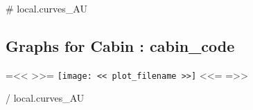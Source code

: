 
{{# local.curves_AU}}

\subsection{Graphs for Cabin : {{ cabin_code }}}

{{=<< >>=}}
\texttt{[image: << plot\_filename >>]}
<<={{ }}=>>

{{/ local.curves_AU}}
